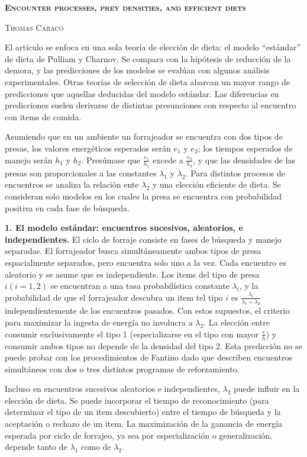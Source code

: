 \documentclass[a4paper,12pt]{article}
\begin{document}
{\scshape\bfseries Encounter processes, prey densities, and efficient diets}

{\scshape Thomas Caraco}

El artículo se enfoca en una sola teoría de elección de dieta: el modelo ``estándar'' de dieta de Pulliam y Charnov. Se compara con la hipótesis de reducción de la demora, y las predicciones de los modelos se evalúan con algunos análisis experimentales. Otras teorías de selección de dieta abarcan un mayor rango de predicciones que aquellas deducidas del modelo estándar. Las diferencias en predicciones suelen derivarse de distintas presunciones con respecto al encuentro con items de comida.

Asumiendo que en un ambiente un forrajeador se encuentra con dos tipos de presas, los valores energéticos esperados serán $e_{1}$ y $e_{2}$; los tiempos esperados de manejo serán $h_{1}$ y $h_{2}$. Presúmase que $\frac{e_{1}}{h_{1}}$ excede a $\frac{e_{2}}{h_{2}}$, y que las densidades de las presas son proporcionales a las constantes $\lambda_{1}$ y $\lambda_{2}$. Para distintos procesos de encuentros se analiza la relación ente $\lambda_{2}$ y una elección eficiente de dieta. Se consideran solo modelos en los cuales la presa se encuentra con probabilidad positiva en cada fase de búsqueda.

{\bfseries 1. El modelo estándar: encuentros sucesivos, aleatorios, e independientes.} El ciclo de forraje consiste en fases de búsqueda y manejo separadas. El forrajeador busca simultáneamente ambos tipos de presa espacialmente separados, pero encuentra solo uno a la vez. Cada encuentro es aleatorio y se asume que es independiente. Los items del tipo de presa $i (i=1,2)$ se encuentran a una tasa probabilística constante $\lambda_{i}$, y la probabilidad de que el forrajeador descubra un item tel tipo $i$ es $\frac{\lambda_{i}}{\lambda_{1}+\lambda_{2}}$ independientemente de los encuentros pasados. Con estos supuestos, el criterio para maximizar la ingesta de energía no involucra a $\lambda_{2}$. La elección entre consumir exclusivamente el tipo 1 (especializarse en el tipo con mayor $\frac{e}{h}$) y consumir ambos tipos no depende de la densidad del tipo 2. Esta predicción no se puede probar con los procedimientos de Fantino dado que describen encuentros simultáneos con dos o tres distintos programas de reforzamiento.

Incluso en encuentros sucesivos aleatorios e independientes, $\lambda_{2}$ puede influir en la elección de dieta. Se puede incorporar el tiempo de reconocimiento (para determinar el tipo de un item descubierto) entre el tiempo de búsqueda y la aceptación o rechazo de un item. La maximización de la ganancia de energía esperada por ciclo de forrajeo, ya sea por especialización o generalización, depende tanto de $\lambda_{1}$ como de $\lambda_{2}$.
\end{document}
